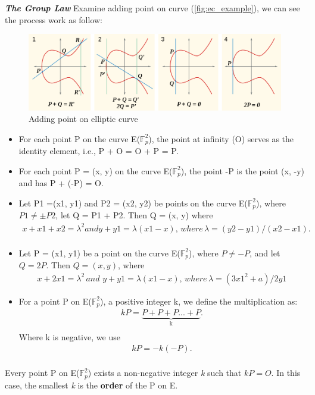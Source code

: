   {\textit {\textbf{The Group Law}}}
Examine adding point on curve (\autoref{fig:ec_example}), we can see the process work as follow:
\begin{figure}[ht!]
  \centering
  \includegraphics[width=1\textwidth]{images/adding_point.png}
  \caption[Adding point on elliptic curve]{Adding point on elliptic curve}
  \label{fig:add_point}
\end{figure}
\begin{itemize}
  \item For each point P on the curve E($\mathbb{F}_{p}^2$), the point at infinity (O) serves as the identity element, i.e., P + O = O + P = P.
  \item For each point P = (x, y) on the curve E($\mathbb{F}_{p}^2$), the point -P is the point (x, -y) and has P + (-P) = O.
  \item Let P1 =(x1, y1) and P2 = (x2, y2) be points on the curve E($\mathbb{F}_{p}^2$), where $P1 \neq \pm P2$, let Q = P1 + P2. Then Q = (x, y) where  \medskip
        \begin{align*}
          x + x1 + x2 = \lambda^2 and y + y1 = \lambda(x1 - x), \,	where \, \lambda = (y2 - y1)/(x2 - x1). \\
        \end{align*}
  \item Let P = (x1, y1) be a point on the curve E($\mathbb{F}_{p}^2$), where $P \neq -P$, and let $Q = 2P$. Then $Q = (x, y)$, where \medskip
        \begin{align*}
          x + 2x1 = \lambda^2 \, and \, \, y + y1 = \lambda(x1 - x), \, where \, \lambda = (3x1^2 + a)/2y1
        \end{align*}
  \item For a point P on E($\mathbb{F}_{p}^2$), a positive integer k, we define the multiplication as: \medskip
        \begin{align*}
          kP = \underbrace{P + P + P ... + P}_\text{k}. \\
        \end{align*}
        Where k is negative, we use
        \begin{align*}
          kP = -k(-P). \\
        \end{align*}
\end{itemize}
Every point P on E($\mathbb{F}_{p}^2$) exists a non-negative integer \emph{k} such that $kP = O$. In this case, the smallest \emph{k} is the {\bf order} of the P on E.


